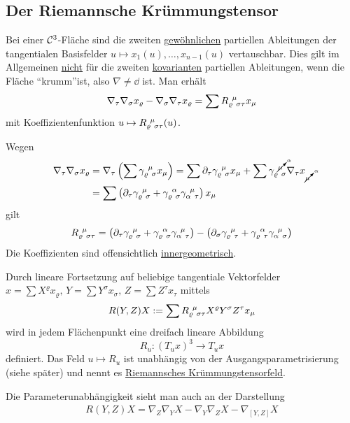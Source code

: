 \subsection{Der Riemannsche Krümmungstensor}
Bei einer \(\mathcal{C}^3\)-Fläche sind die zweiten \uline{gewöhnlichen} partiellen Ableitungen der tangentialen Basisfelder \(u \mapsto x_1(u), \dots, x_{n-1} (u)\) vertauschbar. Dies gilt im Allgemeinen \uline{nicht} für die zweiten \uline{kovarianten} partiellen Ableitungen, wenn die Fläche "`krumm"'ist, also \(\nabla \ne \dd\) ist. Man erhält
\begin{align*}
 \nabla_\tau \nabla_\sigma x_\varrho - \nabla_\sigma \nabla_\tau x_\varrho = \sum R_{\varrho \;\, \sigma \tau}^{\;\, \mu} x_\mu
\end{align*}
mit Koeffizientenfunktion \(u \mapsto R_{\varrho \;\, \sigma \tau}^{\;\, \mu} (u)\). \par
Wegen
\begin{align*}
 \nabla_{\tau} \nabla_\sigma x_\varrho &= \nabla_\tau \left( \sum \gamma_{\varrho \;\, \sigma}^{\;\, \mu} x_\mu \right) = \sum \partial_\tau \gamma_{\varrho \;\, \sigma}^{\;\, \mu} x_\mu + \sum \gamma_{\varrho \;\, \sigma}^{\;\, \cancelto{\alpha}{\mu}} \nabla_\tau x_{\cancelto{\alpha}{\mu}} \\
 &=\sum \left(\partial_\tau \gamma_{\varrho \;\, \sigma}^{\;\, \mu} + \gamma_{\varrho \;\, \sigma}^{\;\, \alpha} \gamma_{\alpha \;\, \tau}^{\;\, \mu} \right) x_\mu
\end{align*}
gilt
\[
 R_{\varrho \;\, \sigma \tau}^{\;\, \mu} = \left(\partial_\tau \gamma_{\varrho \;\, \sigma}^{\;\, \mu} + \gamma_{\varrho \;\, \sigma}^{\;\, \alpha} \gamma_{\alpha \;\, \tau}^{\;\, \mu} \right) - \left(\partial_\sigma \gamma_{\varrho \;\, \tau}^{\;\, \mu} + \gamma_{\varrho \;\, \tau}^{\;\, \alpha} \gamma_{\alpha \;\, \sigma}^{\;\, \mu} \right)
\]
Die Koeffizienten sind offensichtlich \uline{innergeometrisch}. \par
Durch lineare Fortsetzung auf beliebige tangentiale Vektorfelder \(x = \sum X^\varrho x_\varrho, \, Y = \sum Y^\sigma x_\sigma, \, Z = \sum Z^\tau x_\tau\) mittels
\begin{align*}
 R(Y,Z)X := \sum R_{\varrho \;\, \sigma \tau}^{\;\, \mu} X^\varrho Y^\sigma Z^\tau x_\mu
\end{align*}
wird in jedem Flächenpunkt eine dreifach lineare Abbildung 
\[
 R_u \colon (T_u x)^3 \to T_u x
\]
definiert. Das Feld \(u \mapsto R_u\) ist unabhängig von der Ausgangsparametrisierung (siehe später) und nennt es \uline{Riemannsches Krümmungstensorfeld}.

\begin{bemerkung}
 Die Parameterunabhängigkeit sieht man auch an der Darstellung
 \begin{align*}
  R(Y,Z)X = \nabla_Z \nabla_Y X - \nabla_Y \nabla_Z X - \nabla_{[Y,Z]} X
 \end{align*}

\end{bemerkung}

